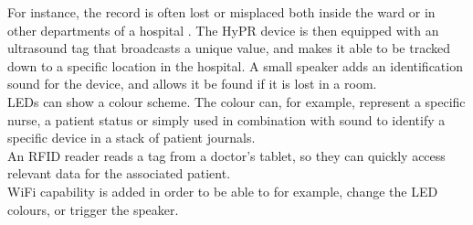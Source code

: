 For instance, the record is often lost or misplaced both inside the ward or in other departments of a hospital \cite{hypr}. The HyPR device is then equipped with an ultrasound tag that broadcasts a unique value, and makes it able to be tracked down to a specific location in the hospital. A small speaker adds an identification sound for the device, and allows it be found if it is lost in a room. \\

LEDs can show a colour scheme. The colour can, for example, represent a specific nurse, a patient status or simply used in combination with sound to identify a specific device in a stack of patient journals. \\

An RFID reader reads a tag from a doctor's tablet, so they can quickly access relevant data for the associated patient. \\

WiFi capability is added in order to be able to for example, change the LED colours, or trigger the speaker.